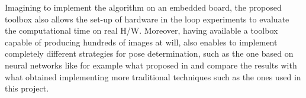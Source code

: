 Imagining to implement the algorithm on an embedded board, the proposed toolbox also allows the set-up of hardware in the loop experiments to evaluate the computational time on real H/W.
Moreover, having available a toolbox capable of producing hundreds of images at will, also enables to implement completely different strategies for pose determination, such as the one based on neural networks like for example what proposed in \cite{Sharma2019} and compare the results with what obtained implementing more traditional techniques such as the ones used in this project.